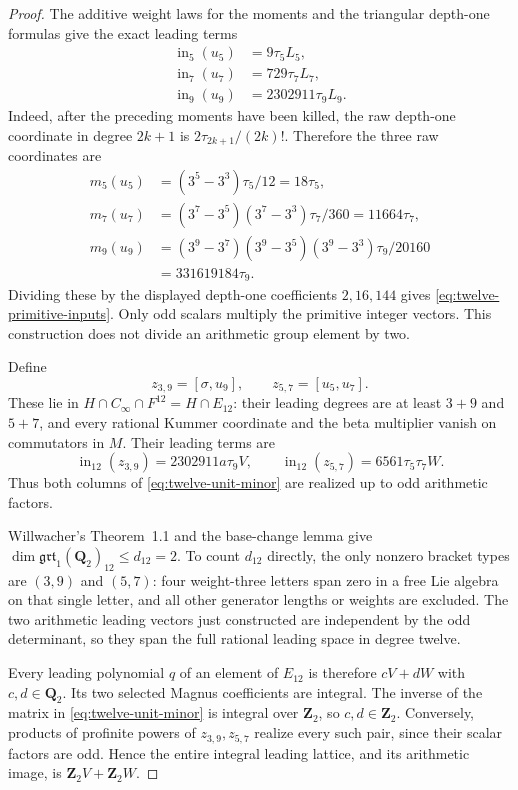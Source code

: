\begin{proof}
The additive weight laws for the moments and the triangular
depth-one formulas give the exact leading terms
\begin{equation}\label{eq:twelve-primitive-inputs}
 \begin{split}
 \operatorname{in}_5(u_5)&=9\tau_5 L_5,\\
 \operatorname{in}_7(u_7)&=729\tau_7 L_7,\\
 \operatorname{in}_9(u_9)&=2302911\tau_9 L_9.
 \end{split}
\end{equation}
Indeed, after the preceding moments have been killed, the raw
depth-one coordinate in degree $2k+1$ is
$2\tau_{2k+1}/(2k)!$. Therefore the three raw coordinates are
\[
 \begin{split}
 m_5(u_5)&=(3^5-3^3)\tau_5/12=18\tau_5,\\
 m_7(u_7)&=(3^7-3^5)(3^7-3^3)\tau_7/360=11664\tau_7,\\
 m_9(u_9)&=(3^9-3^7)(3^9-3^5)(3^9-3^3)\tau_9/20160\\
         &=331619184\tau_9.
 \end{split}
\]
Dividing these by the displayed depth-one coefficients $2,16,144$
gives \eqref{eq:twelve-primitive-inputs}. Only odd scalars
multiply the primitive integer vectors. This construction does
not divide an arithmetic group element by two.

Define
\[
 z_{3,9}=[\sigma,u_9],\qquad z_{5,7}=[u_5,u_7].
\]
These lie in $H\cap C_\infty\cap F^{12}=H\cap E_{12}$:
their leading degrees are at least $3+9$ and $5+7$, and every
rational Kummer coordinate and the beta multiplier vanish on
commutators in $M$. Their leading terms are
\[
 \operatorname{in}_{12}(z_{3,9})=2302911a\tau_9 V,
 \qquad
 \operatorname{in}_{12}(z_{5,7})=6561\tau_5\tau_7 W.
\]
Thus both columns of \eqref{eq:twelve-unit-minor} are realized
up to odd arithmetic factors.

Willwacher's Theorem~1.1 and the base-change lemma give
$\dim\mathfrak{grt}_1(\mathbf Q_2)_{12}\le d_{12}=2$.
To count $d_{12}$ directly, the only nonzero bracket types are
$(3,9)$ and $(5,7)$: four weight-three letters span zero in a
free Lie algebra on that single letter, and all other generator
lengths or weights are excluded. The two arithmetic leading
vectors just constructed are independent by the odd determinant,
so they span the full rational leading space in degree twelve.

Every leading polynomial $q$ of an element of $E_{12}$ is
therefore $cV+dW$ with $c,d\in\mathbf Q_2$. Its two selected
Magnus coefficients are integral. The inverse of the matrix in
\eqref{eq:twelve-unit-minor} is integral over $\mathbf Z_2$,
so $c,d\in\mathbf Z_2$. Conversely, products of profinite powers
of $z_{3,9},z_{5,7}$ realize every such pair, since their scalar
factors are odd. Hence the entire integral leading lattice, and
its arithmetic image, is $\mathbf Z_2V+\mathbf Z_2W$.


\end{proof}
